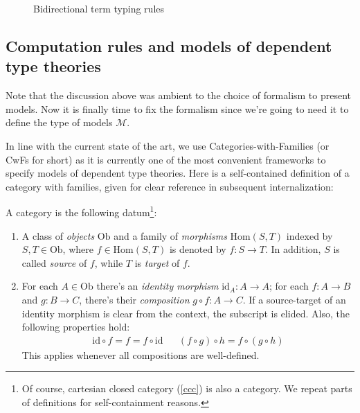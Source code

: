 \begin{figure}
\caption{Bidirectional term typing rules}
\label{twoltt-typing}
\end{figure}

\subsection{Computation rules and models of dependent
type theories}

Note that the discussion above was ambient to the choice of
formalism to present models. Now it is finally time to
fix the formalism since we're going to need it to
define the type of models $\mathcal{M}$.

In line with the current state of the art, we use
Categories-with-Families \cite{castellan2020cwf} (or
CwFs for short) as it is currently one of the most
convenient frameworks to specify models of dependent
type theories. Here is a self-contained definition of
a category with families, given for clear reference in
subsequent internalization:

\begin{definition}[Category]
A category is the following datum\footnote{Of course,
cartesian closed category (\ref{ccc}) is also a
category. We repeat parts of definitions for
self-containment reasons.}:
\begin{enumerate}
    \item A class of \textit{objects} $\mathrm{Ob}$ and
        a family of \textit{morphisms}
        $\mathrm{Hom}(S, T)$ indexed by
        $S,T\in\mathrm{Ob}$, where $f\in\mathrm{Hom}(S,
        T)$ is denoted by $f:S\to T$. In addition, $S$
        is called \textit{source} of $f$, while $T$ is
        \textit{target} of $f$.
    \item For each $A\in\mathrm{Ob}$ there's an
        \textit{identity morphism} $\mathrm{id}_A:
        A\to A$; for each $f:A\to B$ and $g:B\to C$,
        there's their \textit{composition} $g\circ
        f:A\to C$. If a source-target of an identity
        morphism is clear from the context, the
        subscript is elided. Also, the following
        properties hold:
        \begin{align*}
            \mathrm{id}\circ f = f = f\circ\mathrm{id}
            & &
            (f \circ g) \circ h = f \circ (g \circ h)
        \end{align*}
        This applies whenever all compositions are
        well-defined.
\end{enumerate}
\end{definition}

